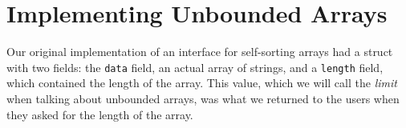 





\section{Implementing Unbounded Arrays}
\label{sec:ubarrays:implementing}

Our original implementation of an interface for self-sorting arrays
had a struct with two fields: the \lstinline'data' field, an actual
array of strings, and a \lstinline'length' field, which contained the
length of the array.  This value, which we will call the \emph{limit}
when talking about unbounded arrays, was what we returned to the users
when they asked for the length of the array.


